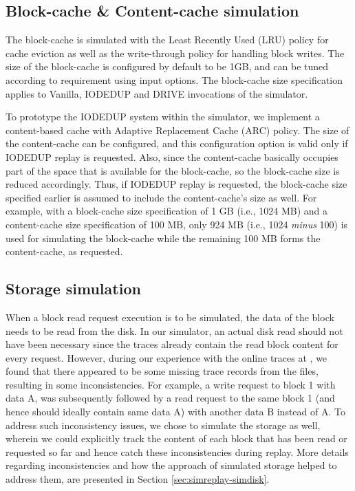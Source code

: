 \subsection{Block-cache \& Content-cache simulation}
The block-cache is simulated with the Least Recently Used (LRU) policy
for cache eviction as well as the write-through policy for handling
block writes. The size of the block-cache is configured by default 
to be 1GB, and can be tuned according to requirement using input options.
The block-cache size specification applies to Vanilla, IODEDUP and DRIVE
invocations of the simulator. 

To prototype the IODEDUP system within the simulator, we implement a 
content-based cache with Adaptive Replacement Cache (ARC) policy.
The size of the content-cache can be configured, and this configuration
option is valid only if IODEDUP replay is requested. Also, since
the content-cache basically occupies part of the space that is available
for the block-cache, so the block-cache size is reduced accordingly.
Thus, if IODEDUP replay is requested, the block-cache size specified earlier
is assumed to include the content-cache's size as well.
For example, with a block-cache size specification of 1 GB (i.e., 1024 MB) and 
a content-cache size specification of 100 MB, only 
924 MB (i.e., 1024 \textit{minus} 100) is used
for simulating the block-cache while the remaining 100 MB forms the
content-cache, as requested.

\subsection{Storage simulation}
When a block read request execution is to be simulated, the data of the
block needs to be read from the disk. In our simulator, an
actual disk read should not have been necessary since the traces already 
contain the read block content for every request. However, during our
experience with the online traces at \cite{iodedup-online}, we found that
there appeared to be some missing trace records from the files, resulting
in some inconsistencies. For example, a write request 
to block 1 with data A, was subsequently followed by a read request to the
same block 1 (and hence should ideally contain same data A) with
another data B instead of A. To address such inconsistency issues,
we chose to simulate the storage as well, wherein we could explicitly track
the content of each block that has been read or requested so far and hence
catch these inconsistencies during replay. More details regarding 
inconsistencies and how the approach of simulated storage helped to address 
them, are presented in Section \ref{sec:simreplay-simdisk}.

